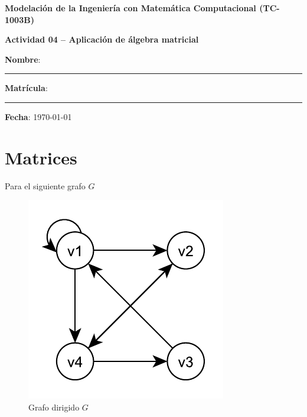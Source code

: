 \documentclass[spanish, 10pt]{article}
\begin{document}
\begin{center}
	{\Large \textbf{Modelación de la Ingeniería con Matemática Computacional (TC-1003B)}}
	
	\bigskip
	{\large \textbf{Actividad 04 -- Aplicación de álgebra matricial}}
\end{center}

\bigskip
{\large \textbf{Nombre}: \rule{13.7 cm}{0.4mm}}



\bigskip
{\large \textbf{Matrícula}: \rule{5 cm}{0.4mm}} \hfill {\large \textbf{Fecha}: \today}

\bigskip


\section{Matrices}

Para el siguiente grafo $G$

\begin{figure}[htbp]
    \centering
    \includegraphics{digraph02.pdf}
    \caption{Grafo dirigido $G$}
    \label{fig:digraph}
\end{figure}
\end{document}
